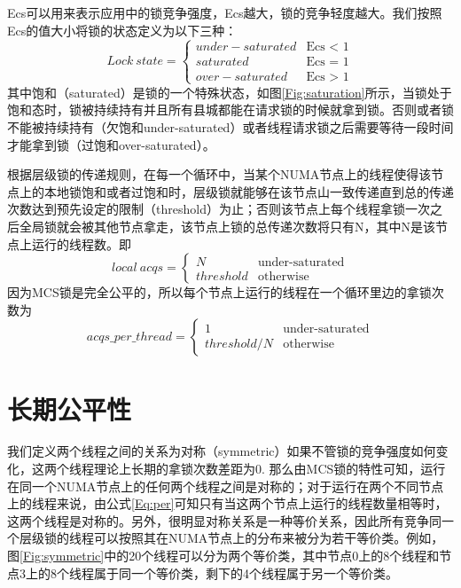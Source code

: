 Ecs可以用来表示应用中的锁竞争强度，Ecs越大，锁的竞争轻度越大。我们按照Ecs的值大小将锁的状态定义为以下三种：
\begin{equation}\label{Eq:state}
Lock\ state =
\begin{cases}
under-saturated &\text{Ecs < 1}\\
saturated &\text{Ecs = 1}\\
over-saturated &\text{Ecs > 1}
\end{cases}
\end{equation}
其中饱和（saturated）是锁的一个特殊状态，如图\ref{Fig:saturation}所示，当锁处于饱和态时，锁被持续持有并且所有县城都能在请求锁的时候就拿到锁。否则或者锁不能被持续持有（欠饱和under-saturated）或者线程请求锁之后需要等待一段时间才能拿到锁（过饱和over-saturated）。

根据层级锁的传递规则，在每一个循环中，当某个NUMA节点上的线程使得该节点上的本地锁饱和或者过饱和时，层级锁就能够在该节点山一致传递直到总的传递次数达到预先设定的限制（threshold）为止；否则该节点上每个线程拿锁一次之后全局锁就会被其他节点拿走，该节点上锁的总传递次数将只有N，其中N是该节点上运行的线程数。即
\begin{equation}\label{Eq:localtrans}
local\ acqs =
\begin{cases}
N &\text{under-saturated}\\
threshold &\text{otherwise}
\end{cases}
\end{equation}
因为MCS锁是完全公平的，所以每个节点上运行的线程在一个循环里边的拿锁次数为
\begin{equation}\label{Eq:per}
acqs\_per\_thread =
\begin{cases}
1 &\text{under-saturated}\\
threshold / N &\text{otherwise}
\end{cases}
\end{equation}
\section{长期公平性}
我们定义两个线程之间的关系为对称（symmetric）如果不管锁的竞争强度如何变化，这两个线程理论上长期的拿锁次数差距为0. 那么由MCS锁的特性可知，运行在同一个NUMA节点上的任何两个线程之间是对称的；对于运行在两个不同节点上的线程来说，由公式\ref{Eq:per}可知只有当这两个节点上运行的线程数量相等时，这两个线程是对称的。另外，很明显对称关系是一种等价关系，因此所有竞争同一个层级锁的线程可以按照其在NUMA节点上的分布来被分为若干等价类。例如，图\ref{Fig:symmetric}中的20个线程可以分为两个等价类，其中节点0上的8个线程和节点3上的8个线程属于同一个等价类，剩下的4个线程属于另一个等价类。

